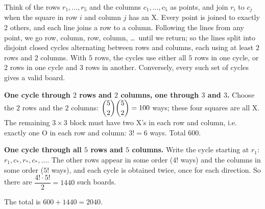 Think of the rows $r_1,\dots,r_5$ and the columns $c_1,\dots,c_5$ as points, and join $r_i$ to $c_j$ when the square in row $i$ and column $j$ has an X. Every point is joined to exactly $2$ others, and each line joins a row to a column. Following the lines from any point, we go row, column, row, column, \dots\ until we return; so the lines split into disjoint closed cycles alternating between rows and columns, each using at least $2$ rows and $2$ columns. With $5$ rows, the cycles use either all $5$ rows in one cycle, or $2$ rows in one cycle and $3$ rows in another. Conversely, every such set of cycles gives a valid board.

\textbf{One cycle through $2$ rows and $2$ columns, one through $3$ and $3$.} Choose the $2$ rows and the $2$ columns: $\dbinom52\dbinom52=100$ ways; these four squares are all X. The remaining $3\times3$ block must have two X's in each row and column, i.e. exactly one O in each row and column: $3!=6$ ways. Total $600$.

\textbf{One cycle through all $5$ rows and $5$ columns.} Write the cycle starting at $r_1$: $r_1,c_{\ast},r_{\ast},c_{\ast},\dots$. The other rows appear in some order ($4!$ ways) and the columns in some order ($5!$ ways), and each cycle is obtained twice, once for each direction. So there are $\dfrac{4!\cdot5!}{2}=1440$ such boards.

The total is $600+1440=\boxed{2040}$.
